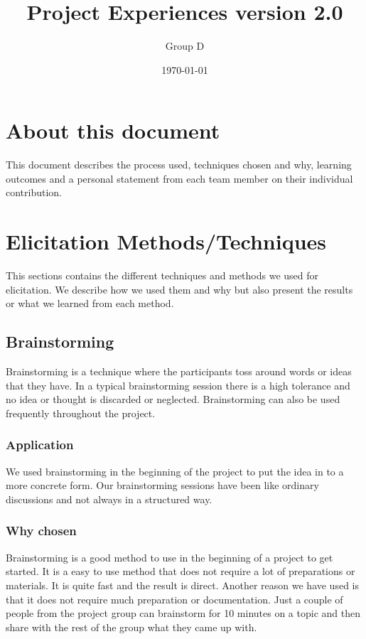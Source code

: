 \documentclass[a4paper]{article}
\title{Project Experiences version 2.0}
\author{Group D}
\date{\today}
\begin{document}
	\maketitle
	\thispagestyle{empty}
	\setcounter{page}{0}
	\pagebreak
	\tableofcontents
	\pagebreak
	
	\section{About this document}
	This document describes the process used, techniques chosen and why, learning outcomes and a personal statement from each team member on their individual contribution.
	\section{Elicitation Methods/Techniques}
This sections contains the different techniques and methods we used for elicitation. We describe how we used them and why but also present the results or what we learned from each method.
	\subsection{Brainstorming}
Brainstorming is a technique where the participants toss around words or ideas that they have. In a typical brainstorming session there is a high tolerance and no idea or thought is discarded or neglected. Brainstorming can also be used frequently throughout the project.
		\subsubsection{Application}
We used brainstorming in the beginning of the project to put the idea in to a more concrete form. Our brainstorming sessions have been like ordinary discussions and not always in a structured way.
		\subsubsection{Why chosen}
Brainstorming is a good method to use in the beginning of a project to get started. It is a easy to use method that does not require a lot of preparations or materials. It is quite fast and the result is direct. Another reason we have used is that it does not require much preparation or documentation. Just a couple of people from the project group can brainstorm for 10 minutes on a topic and then share with the rest of the group what they came up with.
\end{document}
